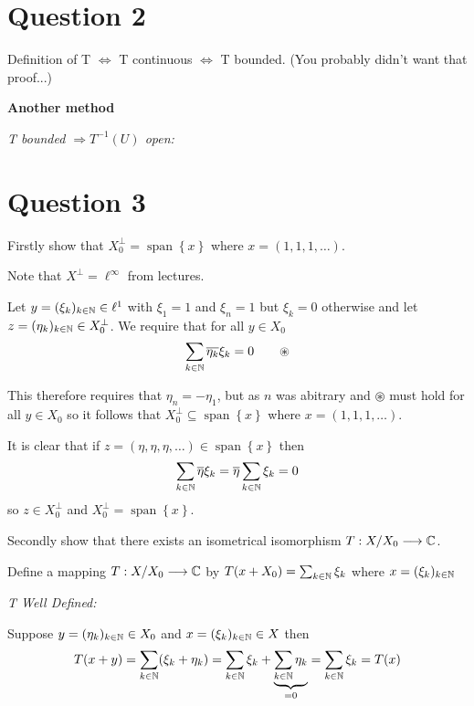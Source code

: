 \documentclass{unswmaths}
\begin{document}
\section*{Question 2}

Definition of T $ \Leftrightarrow $ T continuous $ \Leftrightarrow $ T bounded. (You probably didn't want that proof...)

\textbf{Another method}

\emph{T bounded $ \Rightarrow T^{-1}(U) $ open:}



\section*{Question 3}

Firstly show that $ X_0^\perp = \operatorname{span}\left\{ x \right\} $ where $ x = (1,1,1, \ldots ) $.

Note that $ X^\perp = \ell^\infty $ from lectures. 

Let $ y = (\xi_k)_{k\in\mathbb{N}} \in \ell^1 $ with $ \xi_1 = 1 $ and $ \xi_n = 1 $ but $ \xi_k = 0 $ otherwise and let $ z = ( \eta_k )_{k \in \mathbb{N}} \in X_0^\perp $. We require that for all $ y \in X_0 $
$$
	\sum_{k \in \mathbb{N}} \overline{\eta_k} \xi_k = 0 \ \ \ \ \ \ \circledast
$$

This therefore requires that $ \eta_n = -\eta_1 $, but as $ n $ was abitrary and $\circledast $ must hold for all $ y \in X_0 $ so it follows that $ X_0^\perp \subseteq \operatorname{span}\left\{ x\right\}$ where $ x = (1,1,1,\ldots) $.

It is clear that if $ z = (\eta, \eta, \eta, \ldots) \in \operatorname{span}\left\{ x \right\} $ then 
$$
	\sum_{k \in \mathbb{N}} \overline{\eta} \xi_k = \overline{\eta} \sum_{k \in \mathbb{N}} \xi_k = 0
$$
so $ z \in X_0^\perp $ and $ X_0^\perp = \operatorname{span}\left\{ x \right\} $.

Secondly show that there exists an isometrical isomorphism $ T : X/X_0 \longrightarrow \mathbb{C} $.

Define a mapping $ T : X/X_0 \longrightarrow \mathbb{C} $ by $ T(x + X_0) = \sum_{k \in \mathbb{N}}\xi_k $ where $ x = (\xi_k)_{k \in \mathbb{N}} $

\emph{T Well Defined: }

Suppose $ y = (\eta_k)_{k \in \mathbb{N}} \in X_0 $ and $ x = (\xi_k)_{k \in \mathbb{N}} \in X $ then 
$$ T(x +y) =  \sum_{k \in \mathbb{N}} (\xi_k + \eta_k) = \sum_{k \in \mathbb{N}} \xi_k + \underbrace{\sum_{k \in \mathbb{N}} \eta_k}_{=0} = \sum_{k \in \mathbb{N}} \xi_k = T(x) $$
\end{document}
